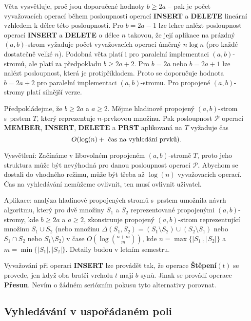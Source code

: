 \documentclass[a4paper,12pt]{article}
\begin{document}
Věta vysvětluje, proč jsou doporučené hodnoty $
b\ge 2a$ -- 
pak je počet vyvažovacích ope\-rací během posloupnosti 
operací {\bf INSERT} a {\bf DELETE} lineární vzhledem k délce 
této posloupnosti. Pro $b=2a-1$ lze lehce nalézt 
posloupnost operací {\bf INSERT} a {\bf DELETE} o délce $n$ takovou, 
že její aplikace na prázdný $(a,b)$-strom vyžaduje počet 
vyvažovacích operací ú\-měrný $n\log n$ (pro každé 
dostatečně velké $n$). Podobná věta platí i pro paralelní 
implementaci $(a,b)$-stromů, ale platí za 
předpokladu $b\ge 2a+2$. Pro $b=2a$ nebo $b=2a+1$ lze 
nalézt posloupnost, která je protipříkladem. Proto se 
doporučuje hodnota $b=2a+2$ pro paralelní implementaci 
$(a,b)$-stromu. Pro propojené $(a,b)$-stromy platí silnější 
verze.

\begin{veta}Předpokládejme, že $b\ge 2a$ a $a\ge 2$. Mějme 
hladinově propojený $(a,b)$-strom s~prstem $T$, který reprezentuje 
$n$-prvkovou množinu. Pak posloupnost $\mathcal P$ operací {\bf MEMBER},
{\bf INSERT}, {\bf DELETE} a {\bf PRST} aplikovaná na $T$ vyžaduje čas 
$$O(\log(n)+\text{\rm\ čas na vyhledání prvků})
.$$
\end{veta}

Vysvětlení: Začínáme v libovolném 
propojeném $(a,b)$-stro\-mě $T$, proto jeho struktura 
může být nevýhodná pro danou pos\-loupnost operací $
\mathcal P$. 
Abychom se dostali do vhodného režimu, může 
být třeba až $\log(n)$ vyvažovacích operací. Čas na 
vy\-hledává\-ní nemůžeme ovlivnit, ten musí 
ovlivnit uživatel.

Aplikace: analýza hladinově propojených stromů s~prstem 
u\-mož\-nila návrh algoritmu, který pro dvě množiny $
S_1$ a $S_2$ 
repre\-zentované propojenými $(a,b)$-stromy, kde $b\ge 2a$ a 
$a\ge 2$, 
zkonstruuje propojený $(a,b)$-strom reprezentující množinu 
$S_1\cup S_2$ (nebo množinu $\Delta (S_1,S_2)=(S_1\setminus S_
2)\cup (S_2\setminus S_1)$ nebo 
$S_1\cap S_2$ nebo $S_1\setminus S_2$) v čase $O(\log\binom {n
+m}m)$, kde 
$n=\max\{|S_1|,|S_2|\}$ a $m=\min\{|S_1|,|S_2|\}$. Detaily budou v letním 
semestru.

Vyvažování při operaci {\bf INSERT} lze provádět 
tak, že operace {\bf Štěpení$(t)$} se provede, jen když oba 
bratři vrcholu $t$ mají $b$ synů. Jinak se provádí 
operace {\bf Přesun}. Nevím o žádném seriózním pokusu tyto 
alternativy porovnat.   

\subsection{Vyhledávání v uspořádaném poli}
\end{document}
